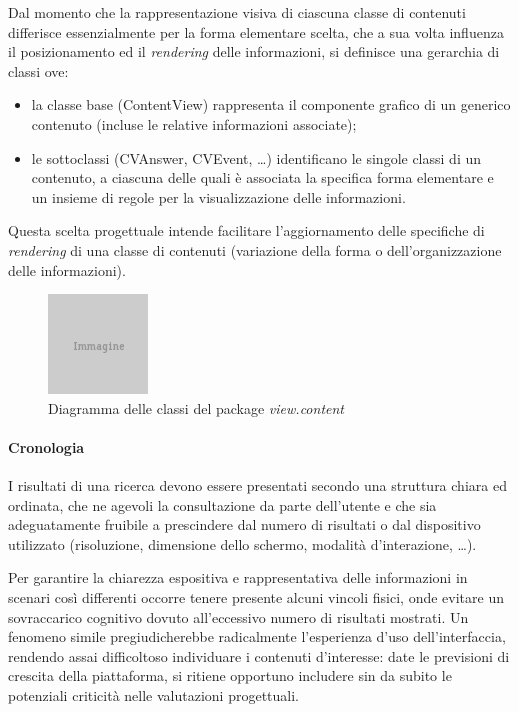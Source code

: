 Dal momento che la rappresentazione visiva di ciascuna classe di contenuti differisce essenzialmente per la forma elementare scelta, che a sua volta influenza il posizionamento ed il \textit{rendering} delle informazioni, si definisce una gerarchia di classi ove:
\begin{itemize}
  \item la classe base (\textsf{ContentView}) rappresenta il componente grafico di un generico contenuto (incluse le relative informazioni associate);
  \item le sottoclassi (\textsf{CVAnswer}, \textsf{CVEvent}, \ldots) identificano le singole classi di un contenuto, a ciascuna delle quali è associata la specifica forma elementare e un insieme di regole per la visualizzazione delle informazioni.
\end{itemize}
Questa scelta progettuale intende facilitare l'aggiornamento delle specifiche di \textit{rendering} di una classe di contenuti (variazione della forma o dell'organizzazione delle informazioni).

\begin{figure}[ht]
	\begin{center}
		\includegraphics{placeholder.png}
		\caption{Diagramma delle classi del package \textit{view.content}}
		\label{fig:tesi:stage:design:view-content-classi}
	\end{center}
\end{figure}
 
\paragraph{Cronologia}
I risultati di una ricerca devono essere presentati secondo una struttura chiara ed ordinata, che ne agevoli la consultazione da parte dell'utente e che sia adeguatamente fruibile a prescindere dal numero di risultati o dal dispositivo utilizzato (risoluzione, dimensione dello schermo, modalità d'interazione, \ldots).

Per garantire la chiarezza espositiva e rappresentativa delle informazioni in scenari così differenti occorre tenere presente alcuni vincoli fisici, onde evitare un sovraccarico cognitivo dovuto all'eccessivo numero di risultati mostrati. Un fenomeno simile pregiudicherebbe radicalmente l'esperienza d'uso dell'interfaccia, rendendo assai difficoltoso individuare i contenuti d'interesse: date le previsioni di crescita della piattaforma, si ritiene opportuno includere sin da subito le potenziali criticità nelle valutazioni progettuali.

